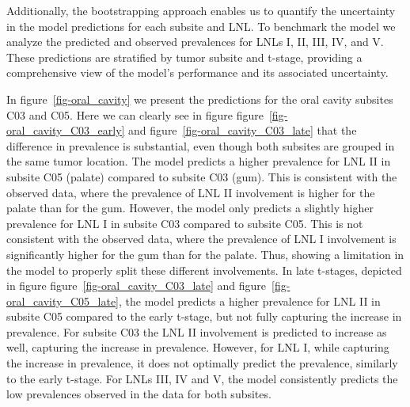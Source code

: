 \documentclass[
  sn-mathphys-num,
]{sn-jnl}
\begin{document}
Additionally, the bootstrapping approach enables us to quantify the
uncertainty in the model predictions for each subsite and LNL. To
benchmark the model we analyze the predicted and observed prevalences
for LNLs I, II, III, IV, and V. These predictions are stratified by
tumor subsite and t-stage, providing a comprehensive view of the model's
performance and its associated uncertainty.

In figure~\ref{fig-oral_cavity} we present the predictions for the oral
cavity subsites C03 and C05. Here we can clearly see in figure
figure~\ref{fig-oral_cavity_C03_early} and
figure~\ref{fig-oral_cavity_C03_late} that the difference in prevalence
is substantial, even though both subsites are grouped in the same tumor
location. The model predicts a higher prevalence for LNL II in subsite
C05 (palate) compared to subsite C03 (gum). This is consistent with the
observed data, where the prevalence of LNL II involvement is higher for
the palate than for the gum. However, the model only predicts a slightly
higher prevalence for LNL I in subsite C03 compared to subsite C05. This
is not consistent with the observed data, where the prevalence of LNL I
involvement is significantly higher for the gum than for the palate.
Thus, showing a limitation in the model to properly split these
different involvements. In late t-stages, depicted in figure
figure~\ref{fig-oral_cavity_C03_late} and
figure~\ref{fig-oral_cavity_C05_late}, the model predicts a higher
prevalence for LNL II in subsite C05 compared to the early t-stage, but
not fully capturing the increase in prevalence. For subsite C03 the LNL
II involvement is predicted to increase as well, capturing the increase
in prevalence. However, for LNL I, while capturing the increase in
prevalence, it does not optimally predict the prevalence, similarly to
the early t-stage. For LNLs III, IV and V, the model consistently
predicts the low prevalences observed in the data for both subsites.
\end{document}

